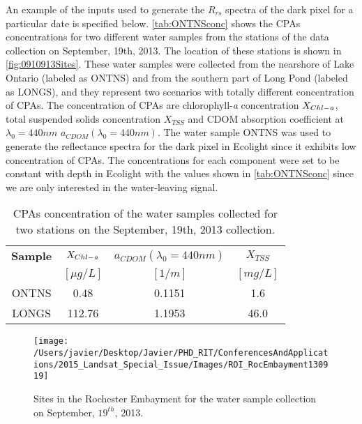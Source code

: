 \documentclass[onecolumn,3p]{elsarticle}
\begin{document}
An example of the inputs used to generate the $R_{rs}$ spectra of the dark pixel for a particular date is specified below. \autoref{tab:ONTNSconc} shows the CPAs concentrations for two different water samples from the stations of the data collection on September, 19th, 2013. The location of these stations is shown in \autoref{fig:0910913Sites}. These water samples were collected from the nearshore of Lake Ontario (labeled as ONTNS) and from the southern part of Long Pond (labeled as LONGS), and they represent two scenarios with totally different concentration of CPAs. The concentration of CPAs are chlorophyll-{\it a} concentration $X_{Chl-{\it a}}$, total suspended solids concentration $X_{TSS}$ and CDOM absorption coefficient at $\lambda_0=440nm$ $a_{CDOM}(\lambda_0=440nm)$. The water sample ONTNS was used to generate the reflectance spectra for the dark pixel in Ecolight since it exhibits low concentration of CPAs. The concentrations for each component were set to be constant with depth in Ecolight with the values shown in \autoref{tab:ONTNSconc} since we are only interested in the water-leaving signal.

\begin{table}[!ht]
\caption{ CPAs concentration of the water samples collected for two stations on the September, 19th, 2013 collection. \label{tab:ONTNSconc} } 
\centering
\begin{tabular}{c|c|c|c} 
 \bfseries{Sample} & \bfseries{$X_{Chl-{\it a}}$} & \bfseries{$a_{CDOM}(\lambda_0=440nm)$}& \bfseries{$X_{TSS}$}\\
 & $[\mu g/L]$ & $[1/m]$ & $[mg/L]$ \\ \hline \hline
ONTNS & 0.48 & 0.1151 & 1.6\\ 
LONGS & 112.76 & 1.1953 & 46.0\\ 
 \end{tabular}
\end{table}

\begin{figure}[htb]
  \centering
  \texttt{[image: /Users/javier/Desktop/Javier/PHD\_RIT/ConferencesAndApplications/2015\_Landsat\_Special\_Issue/Images/ROI\_RocEmbayment130919]}
  \caption{Sites in the Rochester Embayment for the water sample collection on September, $19^{th}$, 2013.\label{fig:0910913Sites} } 
\end{figure}
\end{document}
